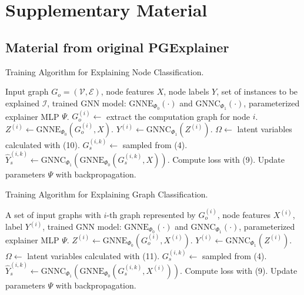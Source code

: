 \chapter{Supplementary Material}

\section{Material from original PGExplainer}
\label{sec:PGE_material}

\begin{algorithm}
    \caption{Training Algorithm for Explaining Node Classification.}
    \label{alg:node-alg}
    \begin{algorithmic}[1]
    \REQUIRE Input graph $G_o = (\mathcal{V}, \mathcal{E})$, node features $X$, node labels $Y$, set of instances to be explained $\mathcal{I}$, trained GNN model: $\text{GNNE}_{\Phi_0}(\cdot)$ and $\text{GNNC}_{\Phi_1}(\cdot)$, parameterized explainer MLP $\Psi$.
        \STATE $G^{(i)}_o \leftarrow$ extract the computation graph for node $i$.
        \STATE $Z^{(i)} \leftarrow \text{GNNE}_{\Phi_0}(G^{(i)}_o, X)$.
        \STATE $Y^{(i)} \leftarrow \text{GNNC}_{\Phi_1}(Z^{(i)})$.
    \ENDFOR
            \STATE $\Omega \leftarrow$ latent variables calculated with (10).
                \STATE $G^{(i,k)}_s \leftarrow$ sampled from (4).
                \STATE $\hat{Y}^{(i,k)}_s \leftarrow \text{GNNC}_{\Phi_1}(\text{GNNE}_{\Phi_0}(G^{(i,k)}_s, X))$.
            \ENDFOR
        \ENDFOR
        \STATE Compute loss with (9).
        \STATE Update parameters $\Psi$ with backpropagation.
    \ENDFOR
    \end{algorithmic}
    \end{algorithm}
    
    \vspace{0.5cm}
    
    \begin{algorithm}
    \caption{Training Algorithm for Explaining Graph Classification.}
    \label{alg:graph-alg}
    \begin{algorithmic}[1]
    \REQUIRE A set of input graphs with $i$-th graph represented by $G^{(i)}_o$, node features $X^{(i)}$, label $Y^{(i)}$, trained GNN model: $\text{GNNE}_{\Phi_0}(\cdot)$ and $\text{GNNC}_{\Phi_1}(\cdot)$, parameterized explainer MLP $\Psi$.
        \STATE $Z^{(i)} \leftarrow \text{GNNE}_{\Phi_0}(G^{(i)}_o, X^{(i)})$.
        \STATE $Y^{(i)} \leftarrow \text{GNNC}_{\Phi_1}(Z^{(i)})$.
    \ENDFOR
            \STATE $\Omega \leftarrow$ latent variables calculated with (11).
                \STATE $G^{(i,k)}_s \leftarrow$ sampled from (4).
                \STATE $\hat{Y}^{(i,k)}_s \leftarrow \text{GNNC}_{\Phi_1}(\text{GNNE}_{\Phi_0}(G^{(i,k)}_s, X^{(i)}))$.
            \ENDFOR
        \ENDFOR
        \STATE Compute loss with (9).
        \STATE Update parameters $\Psi$ with backpropagation.
    \ENDFOR
    \end{algorithmic}
\end{algorithm}

